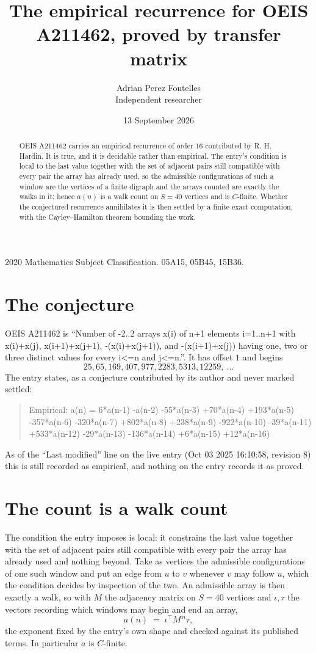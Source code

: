 \documentclass[11pt,a4paper]{article}
\title{The empirical recurrence for OEIS A211462, proved by transfer matrix}
\author{Adrian Perez Fontelles\\ \small Independent researcher}
\date{13 September 2026}
\theoremstyle{plain}
\theoremstyle{definition}
\begin{document}
\maketitle

\begin{abstract}
OEIS A211462 carries an empirical recurrence of order $16$ contributed by R. H. Hardin. It is
true, and it is decidable rather than empirical. The entry's condition is local to the last value together with the set of adjacent pairs still compatible with every pair the array has already used, so
the admissible configurations of such a window are the vertices of a finite digraph and the
arrays counted are exactly the walks in it; hence $a(n)$ is a walk count on $S=40$ vertices
and is $C$-finite. Whether the conjectured recurrence annihilates it is then settled by a
finite exact computation, with the Cayley--Hamilton theorem bounding the work.
\end{abstract}

\noindent\small 2020 Mathematics Subject Classification. 05A15, 05B45, 15B36.\normalsize

\section{The conjecture}

OEIS A211462 is ``Number of -2..2 arrays x(i) of n+1 elements i=1..n+1 with x(i)+x(j), x(i+1)+x(j+1), -(x(i)+x(j+1)), and -(x(i+1)+x(j)) having one, two or three distinct values for every i<=n and j<=n.''. It has offset $1$ and begins
\[
25, 65, 169, 407, 977, 2283, 5313, 12259,\ \dots
\]
The entry states, as a conjecture contributed by its author and never marked settled:
\begin{quote}
Empirical: a(n) = 6*a(n-1) -a(n-2) -55*a(n-3) +70*a(n-4) +193*a(n-5) -357*a(n-6) -320*a(n-7) +802*a(n-8) +238*a(n-9) -922*a(n-10) -39*a(n-11) +533*a(n-12) -29*a(n-13) -136*a(n-14) +6*a(n-15) +12*a(n-16)
\end{quote}
As of the ``Last modified'' line on the live entry (Oct 03 2025 16:10:58, revision 8) this is still
recorded as empirical, and nothing on the entry records it as proved.

\section{The count is a walk count}

The condition the entry imposes is local: it constrains the last value together with the set of adjacent pairs still compatible with every pair the array has already used and nothing beyond. Take as
vertices the admissible configurations of one such window and put an edge from $u$ to $v$
whenever $v$ may follow $u$, which the condition decides by inspection of the two. An
admissible array is then exactly a walk, so with $M$ the adjacency matrix on $S=40$ vertices
and $\iota,\tau$ the vectors recording which windows may begin and end an array,
\[
a(n)\;=\;\iota^{\!\top}M^{\,n}\tau ,
\]
the exponent fixed by the entry's own shape and checked against its published terms. In
particular $a$ is $C$-finite.
\end{document}
